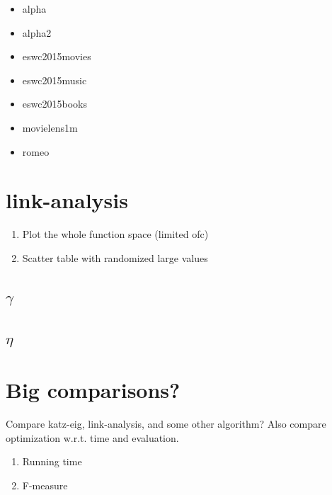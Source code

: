 \begin{itemize}
    \item alpha
    \item alpha2
    \item eswc2015movies
    \item eswc2015music
    \item eswc2015books
    \item movielens1m
    \item romeo
\end{itemize}


\section{link-analysis}

\begin{enumerate}
    \item Plot the whole function space (limited ofc)
    \item Scatter table with randomized large values
\end{enumerate}

\subsection{$\gamma$}

\subsection{$\eta$}


\section{Big comparisons?}

Compare katz-eig, link-analysis, and some other algorithm?
Also compare optimization w.r.t. time and evaluation.

\begin{enumerate}
    \item Running time
    \item F-measure
\end{enumerate}

